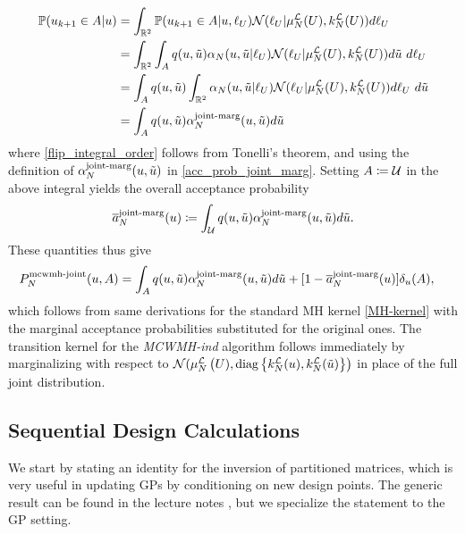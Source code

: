 \documentclass[12pt]{article}
\begin{document}
\begin{align}
\Prob(\indexMCMC[\mcmcIndex+1]{\Par} \in A | \Par)
&= \int_{\R^2} \Prob(\indexMCMC[\mcmcIndex+1]{\Par} \in A | \Par, \llikSamp_{\parMat}) \Gaussian(\llikSamp_{\parMat} | \emMean[\Ndesign]{\llik}(\parMat), \emKer[\Ndesign]{\llik}(\parMat)) d\llikSamp_{\parMat} \\
&= \int_{\R^2} \int_{A} \propDens(\Par, \propPar) \Em[\Ndesign]{\accProbMH}(\Par, \propPar | \llikSamp_{\parMat})  
\Gaussian(\llikSamp_{\parMat} | \emMean[\Ndesign]{\llik}(\parMat), \emKer[\Ndesign]{\llik}(\parMat)) d\propPar \ d\llikSamp_{\parMat} \\
&= \int_{A} \propDens(\Par, \propPar) \int_{\R^2}  \Em[\Ndesign]{\accProbMH}(\Par, \propPar | \llikSamp_{\parMat})  
\Gaussian(\llikSamp_{\parMat} | \emMean[\Ndesign]{\llik}(\parMat), \emKer[\Ndesign]{\llik}(\parMat)) d\llikSamp_{\parMat} \ d\propPar \label{flip_integral_order} \\
&= \int_{A} \propDens(\Par, \propPar) \llikEmJointMarg[\Ndesign]{\accProbMH}(\Par, \propPar)  d\propPar
\end{align}
where \ref{flip_integral_order} follows from Tonelli's theorem, and using the definition of $\llikEmJointMarg[\Ndesign]{\accProbMH}(\Par, \propPar)$
in \ref{acc_prob_joint_marg}. Setting $A \Def \parSpace$ in the above integral yields the overall acceptance probability 
\begin{align}
\llikEmJointMarg[\Ndesign]{\avgAccProbMH}(\Par) \Def \int_{\parSpace} \propDens(\Par, \propPar) \llikEmJointMarg[\Ndesign]{\accProbMH}(\Par, \propPar)  d\propPar. 
\end{align}
These quantities thus give 
\begin{align}
\llikEmJointMCWMH[\Ndesign]{\MarkovKernel}(\Par, A)
&= \int_{A} \propDens(\Par, \propPar) \llikEmJointMarg[\Ndesign]{\accProbMH}(\Par, \propPar) d\propPar
+ [1 - \llikEmJointMarg[\Ndesign]{\avgAccProbMH}(\Par)] \delta_{\Par}(A) \label{MH-kernel}, 
\end{align}
which follows from same derivations for the standard MH kernel \ref{MH-kernel} with the marginal acceptance probabilities substituted for
the original ones. The transition kernel for the \textit{MCWMH-ind} algorithm follows immediately by marginalizing with respect 
to $\Gaussian(\emMean[\Ndesign]{\llik}\left(\parMat), \text{diag}\left\{\emKer[\Ndesign]{\llik}(\Par), \emKer[\Ndesign]{\llik}(\propPar) \right\}\right)$
in place of the full joint distribution. 

\subsection{Sequential Design Calculations}
We start by stating an identity for the inversion of partitioned matrices, which is very useful in updating GPs by 
conditioning on new design points. The generic result can be found in the lecture notes \cite{MinkaMatrixLectures}, 
but we specialize the statement to the GP setting.  
\end{document}
